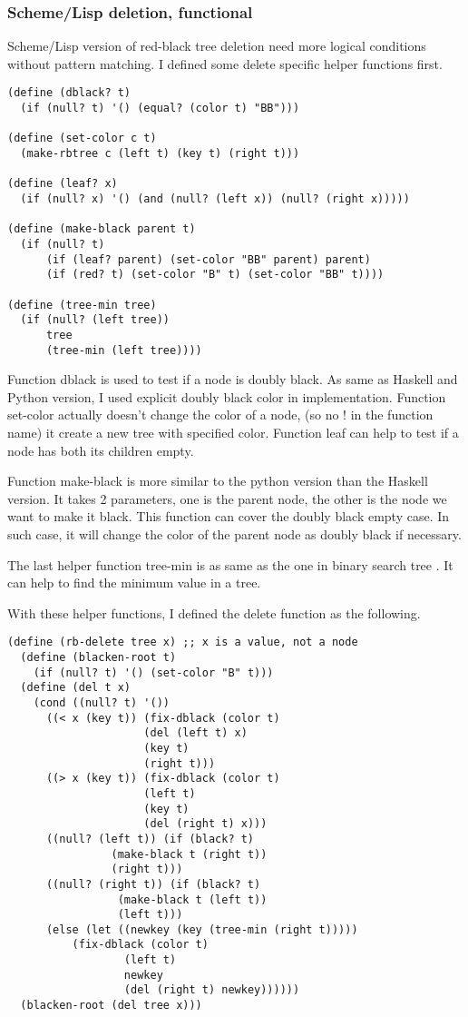 \documentclass{article}
\begin{document}
\subsubsection*{Scheme/Lisp deletion, functional}

Scheme/Lisp version of red-black tree deletion need more logical conditions 
without pattern matching. I defined some delete specific helper functions first.

\lstset{language=lisp}
\begin{lstlisting}
(define (dblack? t)
  (if (null? t) '() (equal? (color t) "BB")))

(define (set-color c t)
  (make-rbtree c (left t) (key t) (right t)))

(define (leaf? x)
  (if (null? x) '() (and (null? (left x)) (null? (right x)))))

(define (make-black parent t)
  (if (null? t)
      (if (leaf? parent) (set-color "BB" parent) parent)
      (if (red? t) (set-color "B" t) (set-color "BB" t))))

(define (tree-min tree) 
  (if (null? (left tree)) 
      tree 
      (tree-min (left tree)))) 
\end{lstlisting}

Function dblack is used to test if a node is doubly black. As same as Haskell
and Python version, I used explicit doubly black color in implementation. Function
set-color actually doesn't change the color of a node, (so no ! in the function
name) it create a new tree with specified color. Function leaf can help
to test if a node has both its children empty.

Function make-black is more
similar to the python version than the Haskell version. It takes 2 parameters,
one is the parent node, the other is the node we want to make it black.
This function can cover the doubly black empty case. In such case, it will
change the color of the parent node as doubly black if necessary.

The last helper function tree-min is as same as the one in binary search tree
\cite{bst-lxy}. It can help to find the minimum value in a tree.

With these helper functions, I defined the delete function as the following.

\begin{lstlisting}
(define (rb-delete tree x) ;; x is a value, not a node
  (define (blacken-root t)
    (if (null? t) '() (set-color "B" t)))
  (define (del t x)
    (cond ((null? t) '())
	  ((< x (key t)) (fix-dblack (color t) 
				     (del (left t) x)
				     (key t)
				     (right t)))
	  ((> x (key t)) (fix-dblack (color t)
				     (left t)
				     (key t)
				     (del (right t) x)))
	  ((null? (left t)) (if (black? t)
				(make-black t (right t))
				(right t)))
	  ((null? (right t)) (if (black? t)
				 (make-black t (left t))
				 (left t)))
	  (else (let ((newkey (key (tree-min (right t)))))
		  (fix-dblack (color t)
			      (left t)
			      newkey
			      (del (right t) newkey))))))
  (blacken-root (del tree x)))
\end{lstlisting}
\end{document}
